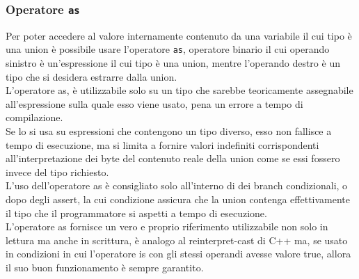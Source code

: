 \subsubsection{Operatore \texttt{as}}
Per poter accedere al valore internamente contenuto da una variabile il cui tipo è una union è possibile usare 
l’operatore \texttt{as}, operatore binario il cui operando sinistro è un'espressione il cui tipo è una union, mentre l’operando destro 
è un tipo che si desidera estrarre dalla union. \\

L’operatore as, è utilizzabile solo su un tipo che sarebbe teoricamente assegnabile all’espressione sulla quale esso viene usato, 
pena un errore a tempo di compilazione. \\

Se lo si usa su espressioni che contengono un tipo diverso, esso non fallisce a tempo di esecuzione, ma si limita a fornire valori 
indefiniti corrispondenti all’interpretazione dei byte del contenuto reale della union come se essi fossero invece del tipo richiesto. \\

L’uso dell’operatore as è consigliato solo all’interno di dei branch condizionali, o dopo degli assert, la cui condizione assicura che la union
contenga effettivamente il tipo che il programmatore si aspetti a tempo di esecuzione. \\   

L’operatore as fornisce un vero e proprio riferimento utilizzabile non solo in lettura ma anche in scrittura, 
è analogo al reinterpret-cast di C++ ma, se usato in condizioni in cui l’operatore is con gli stessi operandi 
avesse valore true, allora il suo buon funzionamento è sempre garantito.